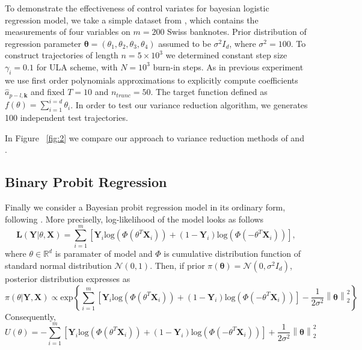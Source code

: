 \documentclass[preprint]{imsart}
\begin{document}
To demonstrate the effectiveness of control variates for bayesian logistic regression model, we take a simple dataset from \cite{mira2013zero}, which contains the measurements of four variables on $m=200$ Swiss banknotes. Prior distribution of regression parameter $\mathbf{\theta} = \left( \theta_1, \theta_2, \theta_3, \theta_4 \right)$ assumed to be $\sigma^2 I_d$, where $\sigma^2 = 100$. To construct trajectories of length $n = 5 \times 10^3 $ we determined constant step size $\gamma_i = 0.1$ for ULA scheme, with $N = 10^3$ burn-in steps. As in previous experiment we use first order polynomials approximations to explicitly compute coefficients $\hat{a}_{p-l,\mathbf{k}}$ and fixed $T = 10$ and $n_{trunc} = 50$. The target function defined as $f(\theta) = \sum_{i=1}^{i=d}\theta_i$.  In order to test our variance reduction algorithm, we generates 100 independent test trajectories. 

In Figure ~\ref{fig:2} we compare our approach to variance reduction methods of \cite{mira2013zero} and \cite{brosse2018diffusion}.

\subsection{Binary Probit Regression}

Finally we consider a Bayesian probit regression model in its ordinary form, following \cite{mira2013zero}. More preciselly, log-likelihood of the model looks as follows
\begin{equation*}
    \mathbf{L}(\mathbf{Y}| \theta, \mathbf{X}) = \sum_{i=1}^{m} \left[ \mathbf{Y}_i \text{log} (\Phi(\theta^T \mathbf{X}_i)) + (1-\mathbf{Y}_i) \text{log}(\Phi(-\theta^T \mathbf{X}_i))\right],
\end{equation*}
where $\theta \in \mathbb{R}^d$ is paramater of model and $\Phi$ is cumulative distribution function of standard normal distribution $\mathcal{N}(0,1)$. Then, if prior $\pi(\mathbf{\theta}) = \mathcal{N}(0, \sigma^2 I_d)$, posterior distribution expresses as
\begin{equation*}
    \pi(\theta | \mathbf{Y}, \mathbf{X})  \propto \text{exp} \left\{\sum_{i=1}^{m} \left[\mathbf{Y}_i \text{log} (\Phi(\theta^T \mathbf{X}_i)) + (1-\mathbf{Y}_i) \text{log}(\Phi(-\theta^T \mathbf{X}_i))\right]- \frac{1}{2\sigma^2} \left\| \mathbf{\theta}\right\|_2^2  \right\}
\end{equation*}
Consequently, 
\begin{equation*}
    U(\theta) =  - \sum_{i=1}^{m} \left[\mathbf{Y}_i \text{log} (\Phi(\theta^T \mathbf{X}_i)) + (1-\mathbf{Y}_i) \text{log}(\Phi(-\theta^T \mathbf{X}_i))\right] + \frac{1}{2\sigma^2} \left\| \mathbf{\theta}\right\|_2^2
\end{equation*}
\end{document}
